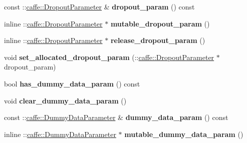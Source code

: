 \begin{DoxyCompactItemize}
\mbox{\label{classcaffe_1_1_layer_parameter_a0393818b10a33234adabbcef63587af0}} 
const \+::\mbox{\hyperlink{classcaffe_1_1_dropout_parameter}{caffe\+::\+Dropout\+Parameter}} \& {\bfseries dropout\+\_\+param} () const
\item 
\mbox{\label{classcaffe_1_1_layer_parameter_ade4fb9c994ba980995cc7d3ef531b421}} 
inline \+::\mbox{\hyperlink{classcaffe_1_1_dropout_parameter}{caffe\+::\+Dropout\+Parameter}} $\ast$ {\bfseries mutable\+\_\+dropout\+\_\+param} ()
\item 
\mbox{\label{classcaffe_1_1_layer_parameter_aeef18d111d0c3e839e44187f890e4065}} 
inline \+::\mbox{\hyperlink{classcaffe_1_1_dropout_parameter}{caffe\+::\+Dropout\+Parameter}} $\ast$ {\bfseries release\+\_\+dropout\+\_\+param} ()
\item 
\mbox{\label{classcaffe_1_1_layer_parameter_a73cff9def6ef690c74c0eb27dba8aedf}} 
void {\bfseries set\+\_\+allocated\+\_\+dropout\+\_\+param} (\+::\mbox{\hyperlink{classcaffe_1_1_dropout_parameter}{caffe\+::\+Dropout\+Parameter}} $\ast$dropout\+\_\+param)
\item 
\mbox{\label{classcaffe_1_1_layer_parameter_a5129d1ac6da1dba8c4f596a825aea332}} 
bool {\bfseries has\+\_\+dummy\+\_\+data\+\_\+param} () const
\item 
\mbox{\label{classcaffe_1_1_layer_parameter_afd812946e1390b585b79a38e1ea73b21}} 
void {\bfseries clear\+\_\+dummy\+\_\+data\+\_\+param} ()
\item 
\mbox{\label{classcaffe_1_1_layer_parameter_a8bc57c87d513c21f11f69daf30a6f8ee}} 
const \+::\mbox{\hyperlink{classcaffe_1_1_dummy_data_parameter}{caffe\+::\+Dummy\+Data\+Parameter}} \& {\bfseries dummy\+\_\+data\+\_\+param} () const
\item 
\mbox{\label{classcaffe_1_1_layer_parameter_a31559553e90cf9029b71e5cacd9957d0}} 
inline \+::\mbox{\hyperlink{classcaffe_1_1_dummy_data_parameter}{caffe\+::\+Dummy\+Data\+Parameter}} $\ast$ {\bfseries mutable\+\_\+dummy\+\_\+data\+\_\+param} ()

\end{DoxyCompactItemize}
